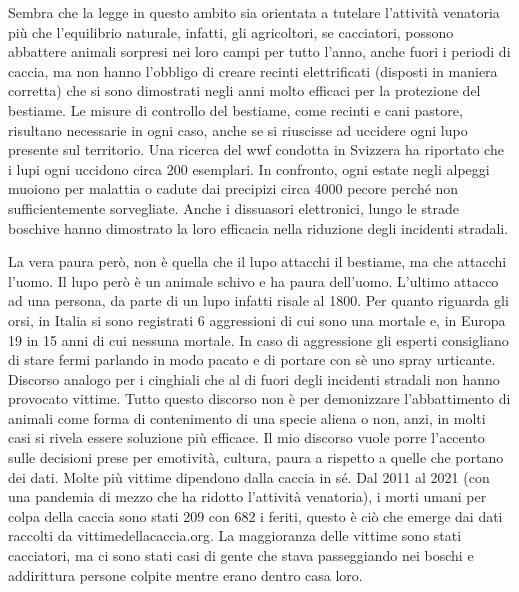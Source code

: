 \documentclass[12pt]{book} %
\begin{document}
\begin{mdframed}[linewidth=1pt]
Sembra che la legge in questo ambito sia orientata a tutelare l'attività venatoria più che
l'equilibrio naturale, infatti, gli agricoltori, se cacciatori, possono abbattere animali sorpresi
nei loro campi per tutto l'anno, anche fuori i periodi di caccia, ma non hanno
l'obbligo di creare recinti elettrificati (disposti in maniera corretta) che si sono dimostrati
negli anni molto efficaci per la protezione del bestiame. Le misure di controllo del bestiame, come recinti e cani
pastore, risultano necessarie in ogni caso, anche se si riuscisse ad uccidere ogni lupo presente sul territorio. Una
ricerca del wwf condotta in Svizzera ha riportato che i lupi ogni uccidono circa 200 esemplari. In confronto, ogni
estate negli alpeggi muoiono per malattia o cadute dai precipizi circa 4000 pecore perché non sufficientemente
sorvegliate. Anche i dissuasori elettronici, lungo le strade boschive hanno dimostrato la loro efficacia nella
riduzione degli incidenti stradali.

La vera paura però, non è quella che il lupo attacchi il bestiame, ma che attacchi l'uomo. Il lupo
però è un animale schivo e ha paura dell'uomo. L'ultimo attacco ad una persona, da parte di un lupo infatti risale al 1800.
Per quanto riguarda gli orsi, in Italia si sono registrati 6 aggressioni di cui sono una mortale e, in Europa 19 in 15 anni di cui nessuna mortale. In caso di aggressione gli esperti consigliano di stare fermi parlando in modo pacato e di portare con sè uno spray urticante. Discorso analogo per i cinghiali che al di fuori degli incidenti stradali non hanno provocato vittime.
Tutto questo discorso non è per demonizzare l'abbattimento di animali come forma di contenimento di una specie aliena o non, anzi, in molti casi si rivela essere soluzione più efficace. Il mio discorso vuole porre l'accento sulle decisioni prese per emotività, cultura, paura a rispetto a quelle che portano dei dati.
Molte più vittime dipendono dalla caccia in sé. Dal 2011 al 2021
(con una pandemia di mezzo che ha ridotto l'attività venatoria), i morti umani per colpa della
caccia sono stati 209 con 682 i feriti, questo è ciò che emerge dai dati raccolti da vittimedellacaccia.org. La
maggioranza delle vittime sono stati cacciatori, ma ci sono stati casi di gente che stava passeggiando nei boschi e
addirittura persone colpite mentre erano dentro casa loro. 
\end{mdframed}
\end{document}
